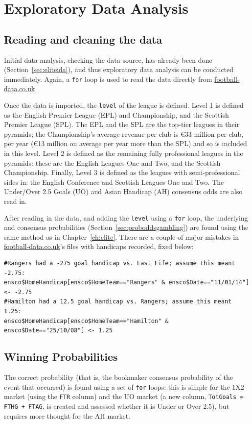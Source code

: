 \documentclass[a4paper,10pt]{report}
\begin{document}
\section{Exploratory Data Analysis}\label{sec:enscoeda}
\subsection*{Reading and cleaning the data}
Initial data analysis, checking the data source, has already been done (Section~\ref{sec:eliteida}), and thus exploratory data analysis can be conducted immediately. Again, a \lstinline|for| loop is used to read the data directly from \url{football-data.co.uk}. \vspace{3mm}

Once the data is imported, the \lstinline|level| of the league is defined. Level 1 is defined as the English Premier League (EPL) and Championship, and the Scottish Premier League (SPL). The EPL and the SPL are the top-tier leagues in their pyramids; the Championship's average revenue per club is \euro{}33 million per club, per year (\euro{}13 million on average per year more than the SPL) \autocite{deloitte20} and so is included in this level. Level 2 is defined as the remaining fully professional leagues in the pyramids: these are the English Leagues One and Two, and the Scottish Championship. Finally, Level 3 is defined as the leagues with semi-professional sides in: the English Conference and Scottish Leagues One and Two. The Under/Over 2.5 Goals (UO) and Asian Handicap (AH) consensus odds are also read in. \vspace{3mm}

After reading in the data, and adding the \lstinline|level| using a \lstinline|for| loop, the underlying and consensus probabilities (Section~\ref{sec:proboddsgambling}) are found using the same method as in Chapter~\ref{ch:elite}. There are a couple of major mistakes in \url{football-data.co.uk}'s files with handicaps recorded, fixed below:
\begin{lstlisting}
#Rangers had a -275 goal handicap vs. East Fife; assume this meant -2.75:
ensco$HomeHandicap[ensco$HomeTeam=="Rangers" & ensco$Date=="11/01/14"] <- -2.75
#Hamilton had a 12.5 goal handicap vs. Rangers; assume this meant 1.25:
ensco$HomeHandicap[ensco$HomeTeam=="Hamilton" & ensco$Date=="25/10/08"] <- 1.25
\end{lstlisting}

\subsection*{Winning Probabilities}
The correct probability (that is, the bookmaker consensus probability of the event that occurred) is found using a set of \lstinline|for| loops: this is simple for the 1X2 market (using the \lstinline|FTR| column) and the UO market (a new column, \lstinline|TotGoals = FTHG + FTAG|, is created and assessed whether it is Under or Over 2.5), but requires more thought for the AH market. \vspace{3mm}
\end{document}
